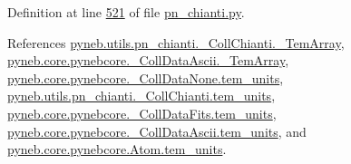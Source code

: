 Definition at line \hyperlink{pn__chianti_8py_source_l00521}{521} of file \hyperlink{pn__chianti_8py_source}{pn\+\_\+chianti.\+py}.



References \hyperlink{pn__chianti_8py_source_l00417}{pyneb.\+utils.\+pn\+\_\+chianti.\+\_\+\+Coll\+Chianti.\+\_\+\+Tem\+Array}, \hyperlink{pynebcore_8py_source_l00982}{pyneb.\+core.\+pynebcore.\+\_\+\+Coll\+Data\+Ascii.\+\_\+\+Tem\+Array}, \hyperlink{pynebcore_8py_source_l00074}{pyneb.\+core.\+pynebcore.\+\_\+\+Coll\+Data\+None.\+tem\+\_\+units}, \hyperlink{pn__chianti_8py_source_l00416}{pyneb.\+utils.\+pn\+\_\+chianti.\+\_\+\+Coll\+Chianti.\+tem\+\_\+units}, \hyperlink{pynebcore_8py_source_l00572}{pyneb.\+core.\+pynebcore.\+\_\+\+Coll\+Data\+Fits.\+tem\+\_\+units}, \hyperlink{pynebcore_8py_source_l00926}{pyneb.\+core.\+pynebcore.\+\_\+\+Coll\+Data\+Ascii.\+tem\+\_\+units}, and \hyperlink{pynebcore_8py_source_l01254}{pyneb.\+core.\+pynebcore.\+Atom.\+tem\+\_\+units}.


